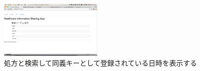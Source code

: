 	\begin{figure}[htbp]
			\includegraphics[width=5cm, bb=0 0 437 688]{./gazou/relationApp.png}
		\caption{処方と検索して同義キーとして登録されている日時を表示する}
		\label{relationApp}
	\end{figure}
